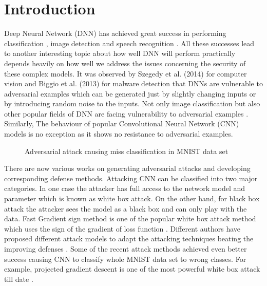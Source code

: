 \documentclass[conference]{IEEEtran}
\begin{document}
\section{Introduction}
Deep Neural Network (DNN) has achieved great success in performing classification \cite{andor2016globally}, image detection \cite{he2015delving} and speech recognition \cite{xiong2016achieving}. All these successes lead to another interesting topic about how well DNN will perform practically depends heavily on how well we address the issues concerning the security of these complex models. It was observed by  Szegedy et al. (2014) for computer vision \cite{goodfellow2014explaining} and Biggio et al. (2013) for malware detection \cite{biggio2013evasion} that DNNs are vulnerable to adversarial examples which can be generated just by slightly changing inputs or by introducing random noise to the inputs. Not only image classification but also other popular fields of DNN are facing vulnerability to adversarial examples \cite{kos2017adversarial,kos2017delving}. Similarly, The behaviour of popular Convolutional Neural Network (CNN) models is no exception as it shows no resistance to adversarial examples. 

\begin{figure}[h]
\centering
{}
\caption{Adversarial attack causing miss classification in MNIST data set}
\end{figure}%
There are now various works on generating adversarial attacks and developing corresponding defense methods. Attacking CNN can be classified into two major categories. In one case the attacker has full access to the network model and parameter which is known as white box attack. On the other hand, for black box attack the attacker sees the model as a black box and can only play with the data. Fast Gradient sign method is one of the popular white box attack method which uses the sign of the gradient of loss function \cite{goodfellow2014explaining}. Different authors have proposed different attack models to adapt the attacking techniques beating the improving defenses \cite{szegedy2013intriguing,kurakin2016adversarial,kos2017delving,papernot2016limitations,moosavi2016deepfool}. Some of the recent attack methods achieved even better success causing CNN to classify whole MNIST data set to wrong classes. For example, projected gradient descent is one of the most powerful white box attack till date \cite{mkadry2017towards}. 
\end{document}
